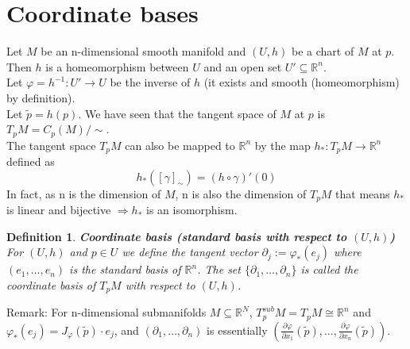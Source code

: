 \documentclass[11pt]{book} %
\newtheorem{definition}{Definition}[section]
\begin{document}

\section{Coordinate bases}


Let \( M \) be an n-dimensional smooth manifold and \( (U, h) \) be a chart of \( M \) at \( p \). \\
Then $h$ is a homeomorphism between \( U \) and an open set \( U' \subseteq \mathbb{R}^n \). \\
Let \(\varphi = h^{-1} : U' \to U \) be the inverse of \( h \) (it exists and smooth (homeomorphism) by definition). \\
Let \( \tilde{p} = h(p) \). We have seen that the tangent space of \( M \) at \( p \) is \( T_pM = C_p(M)/\sim \). \\
The tangent space \( T_pM \) can also be mapped to \( \mathbb{R}^n \) by the map \( h_* : T_pM \to \mathbb{R}^n \) defined as
\begin{equation*}
    h_*([ \gamma ]_\sim) = (h \circ \gamma)'(0) 
\end{equation*}
In fact, as n is the dimension of \( M \), n is also the dimension of \( T_pM \) that means $h_*$ is linear and bijective $\Rightarrow h_*$ is an isomorphism.

\begin{definition}{\textbf{Coordinate basis (standard basis with respect to $(U, h)$)}} \\
    For $(U, h)$ and $ p \in U$ we define the tangent vector $\partial_j := \varphi_*(e_j)$ where $(e_1, \ldots, e_n)$ is the standard basis of $\mathbb{R}^n$.
    The set $\{ \partial_1, \ldots, \partial_n \}$ is called the coordinate basis of $T_pM$ with respect to $(U, h)$.
\end{definition}

Remark: For n-dimensional submanifolds $M \subseteq \mathbb{R}^N$, $T_p^{sub}M = T_pM \cong \mathbb{R}^n$ and $\varphi_*(e_j) = J_{\varphi}(\tilde{p}) \cdot e_j$,
and $(\partial_1, \ldots, \partial_n)$ is essentially $(\frac{\partial \varphi}{\partial x_1}(\tilde{p}), \ldots, \frac{\partial \varphi}{\partial x_n}(\tilde{p}))$.
\end{document}
